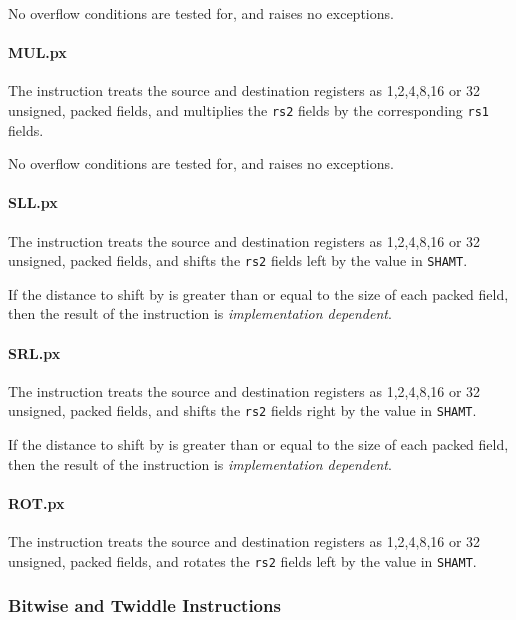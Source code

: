 No overflow conditions are tested for, and  raises no exceptions.

\paragraph{MUL.px}

The instruction  treats the source and destination registers as
1,2,4,8,16 or 32 unsigned, packed fields, and multiplies the {\tt rs2} fields
by the corresponding {\tt rs1} fields.

No overflow conditions are tested for, and  raises no exceptions.

\paragraph{SLL.px}

The instruction  treats the source and destination registers as
1,2,4,8,16 or 32 unsigned, packed fields, and shifts the {\tt rs2} fields
left by the value in {\tt SHAMT}.

If the distance to shift by is greater than or equal to the size of each
packed field, then the result of the  instruction is
{\em implementation dependent}.

\paragraph{SRL.px}

The instruction  treats the source and destination registers as
1,2,4,8,16 or 32 unsigned, packed fields, and shifts the {\tt rs2} fields
right by the value in {\tt SHAMT}.

If the distance to shift by is greater than or equal to the size of each
packed field, then the result of the  instruction is
{\em implementation dependent}.

\paragraph{ROT.px}

The instruction  treats the source and destination registers as
1,2,4,8,16 or 32 unsigned, packed fields, and rotates the {\tt rs2} fields
left by the value in {\tt SHAMT}.

\subsubsection{Bitwise and Twiddle Instructions}


